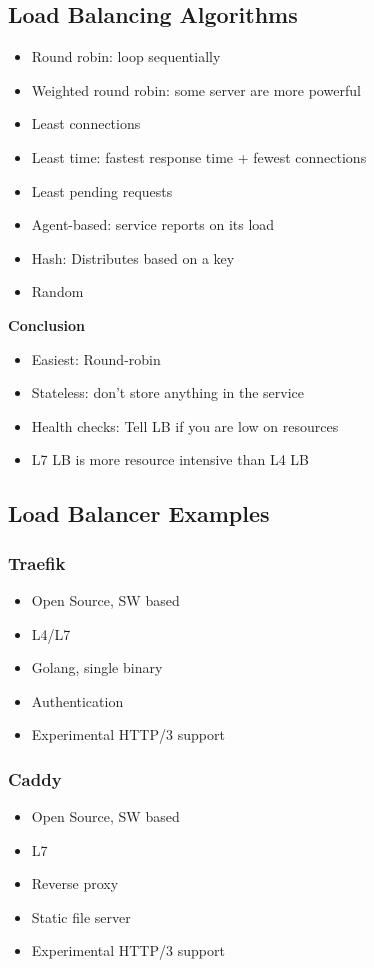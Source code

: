 \subsection{Load Balancing Algorithms}
\begin{itemize}
    \item Round robin: loop sequentially
    \item Weighted round robin: some server are more powerful
    \item Least connections
    \item Least time: fastest response time + fewest connections
    \item Least pending requests
    \item Agent-based: service reports on its load
    \item Hash: Distributes based on a key
    \item Random
\end{itemize}
\textbf{Conclusion}
\begin{itemize}
    \item Easiest: Round-robin
    \item Stateless: don't store anything in the service
    \item Health checks: Tell LB if you are low on resources
    \item L7 LB is more resource intensive than L4 LB
\end{itemize}


\subsection{Load Balancer Examples}
\subsubsection{Traefik}
\begin{itemize}
    \item Open Source, SW based
    \item L4/L7
    \item Golang, single binary
    \item Authentication
    \item Experimental HTTP/3 support
\end{itemize}

\subsubsection{Caddy}
\begin{itemize}
    \item Open Source, SW based
    \item L7
    \item Reverse proxy
    \item Static file server
    \item Experimental HTTP/3 support
\end{itemize}

